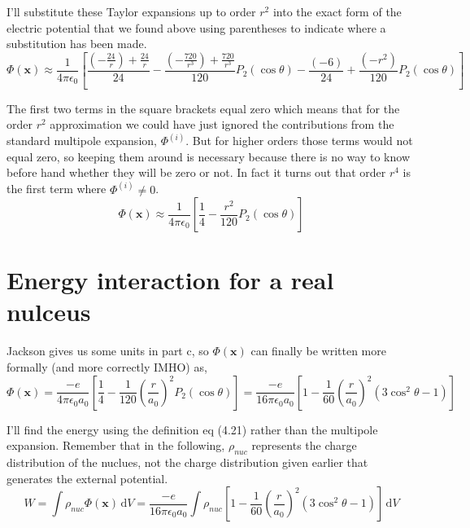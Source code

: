 \documentclass[10pt,a4paper]{article}
\begin{document}
I'll substitute these Taylor expansions up to order $r^2$ into the exact form of the electric potential that we found above using parentheses to indicate where a substitution has been made.
\begin{equation}
\Phi(\mathbf{x})\approx\frac{1}{4\pi\epsilon_0}\left[
\frac{\left(-\frac{24}{r}\right)+\frac{24}{r}}{24}-\frac{\left(-\frac{720}{r^3}\right)+\frac{720}{r^3}}{120}P_2(\cos\theta)-\frac{(-6)}{24}+\frac{(-r^2)}{120}P_2(\cos\theta)
\right]
\end{equation}

The first two terms in the square brackets equal zero which means that for the order $r^2$ approximation we could have just ignored the contributions from the standard multipole expansion, $\Phi^{(i)}$.  But for higher orders those terms would not equal zero, so keeping them around is necessary because there is no way to know before hand whether they will be zero or not.  In fact it turns out that order $r^4$ is the first term where $\Phi^{(i)}\neq0$.
\begin{equation}\boxed{
\Phi(\mathbf{x})\approx\frac{1}{4\pi\epsilon_0}\left[\frac{1}{4}-\frac{r^2}{120}P_2(\cos\theta)\right]
}\end{equation}

\section{Energy interaction for a real nulceus}
Jackson gives us some units in part c, so $\Phi(\mathbf{x})$ can finally be written more formally (and more correctly IMHO) as,
\begin{equation}
\Phi(\mathbf{x})=\frac{-e}{4\pi\epsilon_0a_0}\left[\frac{1}{4}-\frac{1}{120}\left(\frac{r}{a_0}\right)^2 P_2(\cos\theta)\right]
=\frac{-e}{16\pi\epsilon_0a_0}\left[1-\frac{1}{60}\left(\frac{r}{a_0}\right)^2 (3\cos^2\theta-1)\right]
\end{equation}

I'll find the energy using the definition eq (4.21) rather than the multipole expansion.  Remember that in the following, $\rho_{nuc}$ represents the charge distribution of the nuclues, not the charge distribution given earlier that generates the external potential.
\begin{equation}
W=\int \rho_{nuc} \Phi(\mathbf{x}) \,\mathrm{d}V =\frac{-e}{16\pi\epsilon_0 a_0}\int\rho_{nuc}\left[1-\frac{1}{60}\left(\frac{r}{a_0}\right)^2 (3\cos^2\theta-1)\right]\,\mathrm{d}V
\end{equation}
\end{document}
